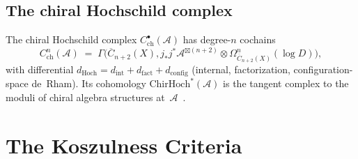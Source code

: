 \documentclass[11pt,reqno]{amsart}
\theoremstyle{definition}
\theoremstyle{remark}
\newcommand{\cA}{\mathcal{A}}
\newcommand{\FM}{\overline{C}}
\newcommand{\ChirHoch}{\mathrm{ChirHoch}}
\numberwithin{equation}{section}
\begin{document}
\subsection{The chiral Hochschild complex}

The chiral Hochschild complex
$C^\bullet_{\mathrm{ch}}(\cA)$ has degree-$n$ cochains
\[
C^n_{\mathrm{ch}}(\cA) \;=\; \Gamma\bigl(\FM_{n+2}(X),
 j_*j^*\cA^{\boxtimes(n+2)}\otimes
 \Omega^n_{\FM_{n+2}(X)}(\log D)\bigr),
\]
with differential
$d_{\mathrm{Hoch}}
 = d_{\mathrm{int}} + d_{\mathrm{fact}} + d_{\mathrm{config}}$
(internal, factorization, configuration-space de~Rham).
Its cohomology $\ChirHoch^*(\cA)$ is the tangent complex to the
moduli of chiral algebra structures at~$\cA$~\cite{LorgatMKD1}.

\section{The Koszulness Criteria}
\label{sec:meta}
\end{document}
